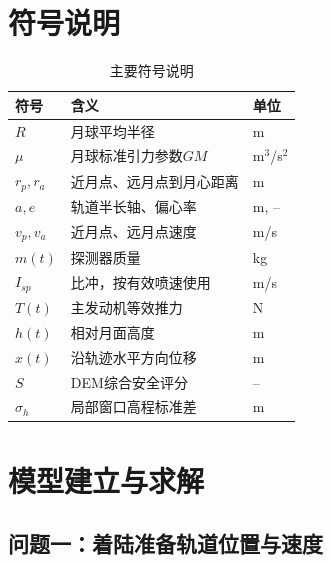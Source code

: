 \documentclass[UTF8,a4paper,12pt]{ctexart}
\begin{document}
\section{符号说明}
\begin{table}[H]
\centering
\caption{主要符号说明}
\begin{tabular}{lll}
\toprule
符号 & 含义 & 单位 \\
\midrule
$R$ & 月球平均半径 & m \\
$\mu$ & 月球标准引力参数$GM$ & m$^3$/s$^2$ \\
$r_p,r_a$ & 近月点、远月点到月心距离 & m \\
$a,e$ & 轨道半长轴、偏心率 & m, -- \\
$v_p,v_a$ & 近月点、远月点速度 & m/s \\
$m(t)$ & 探测器质量 & kg \\
$I_{sp}$ & 比冲，按有效喷速使用 & m/s \\
$T(t)$ & 主发动机等效推力 & N \\
$h(t)$ & 相对月面高度 & m \\
$x(t)$ & 沿轨迹水平方向位移 & m \\
$S$ & DEM综合安全评分 & -- \\
$\sigma_h$ & 局部窗口高程标准差 & m \\
\bottomrule
\end{tabular}
\end{table}

\section{模型建立与求解}
\subsection{问题一：着陆准备轨道位置与速度}
\end{document}
